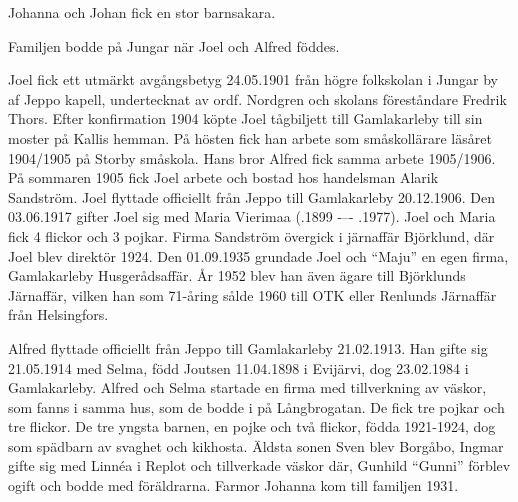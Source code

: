 Johanna och Johan fick en stor barnsakara.
\begin{jhchildren}
  \item {}
  \item {}
  \item {}
  \item {}
  \item {}
  \item {}
  \item {}
  \item {}
  \item {}
\end{jhchildren}
Familjen bodde på Jungar när Joel och Alfred föddes.

Joel fick ett utmärkt avgångsbetyg 24.05.1901 från högre folkskolan i Jungar by af Jeppo kapell, undertecknat av ordf. Nordgren och skolans	föreståndare Fredrik Thors. Efter konfirmation 1904 köpte Joel tågbiljett	till Gamlakarleby till sin moster på Kallis hemman. På hösten fick han arbete som småskollärare läsåret 1904/1905 på Storby småskola. Hans	bror Alfred fick samma arbete 1905/1906. På sommaren 1905 fick Joel arbete och bostad hos handelsman Alarik Sandström. Joel flyttade 	officiellt från Jeppo till Gamlakarleby 20.12.1906. Den 03.06.1917 gifter Joel sig med Maria Vierimaa (.1899  -–-  .1977). Joel och Maria 	fick 4 flickor och 3 pojkar. Firma Sandström övergick i järnaffär Björklund, där Joel blev direktör 1924. Den 01.09.1935 grundade Joel och ``Maju'' en egen firma, Gamlakarleby Husgerådsaffär. År 1952 blev	han även ägare till Björklunds Järnaffär, vilken han som 71-åring sålde 1960 till OTK eller Renlunds Järnaffär från Helsingfors.

Alfred flyttade officiellt från Jeppo till Gamlakarleby 21.02.1913. Han gifte sig 21.05.1914 med Selma, född Joutsen 11.04.1898 i Evijärvi, dog 23.02.1984 i Gamlakarleby. Alfred och Selma startade en firma med tillverkning av väskor, som fanns i samma hus, som de bodde i på Långbrogatan. De fick tre pojkar och tre flickor. De tre yngsta barnen, en pojke och två flickor, födda 1921-1924, dog som spädbarn av svaghet och kikhosta. Äldsta sonen Sven blev Borgåbo, Ingmar gifte sig med Linnéa i Replot och tillverkade väskor där, Gunhild ``Gunni'' förblev ogift och bodde med föräldrarna. Farmor Johanna kom till familjen 1931.

